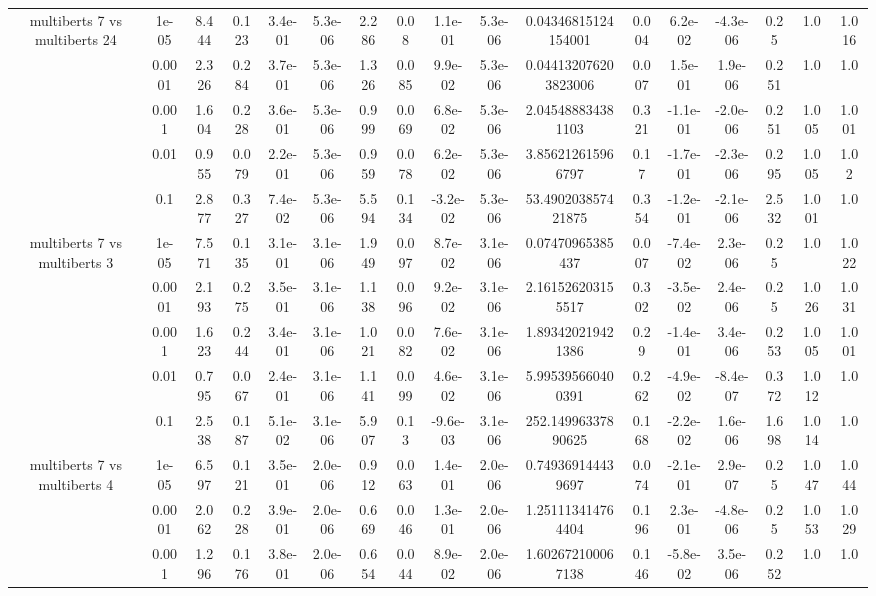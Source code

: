 \begin{tabular}{|c|c|c|c|c|c|c|c|c|c|c|c|c|c|c|c|c|}
\hline
\multirow{5}{*}{multiberts 7 vs multiberts 24} & 1e-05 & 8.444 & 0.123 & 3.4e-01 & 5.3e-06 & 2.286 & 0.08 & 1.1e-01 & 5.3e-06 & 0.04346815124154001 & 0.004 & 6.2e-02 & -4.3e-06 & 0.25 & 1.0 & 1.016 \\
 & 0.0001 & 2.326 & 0.284 & 3.7e-01 & 5.3e-06 & 1.326 & 0.085 & 9.9e-02 & 5.3e-06 & 0.044132076203823006 & 0.007 & 1.5e-01 & 1.9e-06 & 0.251 & 1.0 & 1.0 \\
 & 0.001 & 1.604 & 0.228 & 3.6e-01 & 5.3e-06 & 0.999 & 0.069 & 6.8e-02 & 5.3e-06 & 2.045488834381103 & 0.321 & -1.1e-01 & -2.0e-06 & 0.251 & 1.005 & 1.001 \\
 & 0.01 & 0.955 & 0.079 & 2.2e-01 & 5.3e-06 & 0.959 & 0.078 & 6.2e-02 & 5.3e-06 & 3.856212615966797 & 0.17 & -1.7e-01 & -2.3e-06 & 0.295 & 1.005 & 1.02 \\
 & 0.1 & 2.877 & 0.327 & 7.4e-02 & 5.3e-06 & 5.594 & 0.134 & -3.2e-02 & 5.3e-06 & 53.490203857421875 & 0.354 & -1.2e-01 & -2.1e-06 & 2.532 & 1.001 & 1.0 \\
\hline
\multirow{5}{*}{multiberts 7 vs multiberts 3} & 1e-05 & 7.571 & 0.135 & 3.1e-01 & 3.1e-06 & 1.949 & 0.097 & 8.7e-02 & 3.1e-06 & 0.07470965385437 & 0.007 & -7.4e-02 & 2.3e-06 & 0.25 & 1.0 & 1.022 \\
 & 0.0001 & 2.193 & 0.275 & 3.5e-01 & 3.1e-06 & 1.138 & 0.096 & 9.2e-02 & 3.1e-06 & 2.161526203155517 & 0.302 & -3.5e-02 & 2.4e-06 & 0.25 & 1.026 & 1.031 \\
 & 0.001 & 1.623 & 0.244 & 3.4e-01 & 3.1e-06 & 1.021 & 0.082 & 7.6e-02 & 3.1e-06 & 1.893420219421386 & 0.29 & -1.4e-01 & 3.4e-06 & 0.253 & 1.005 & 1.001 \\
 & 0.01 & 0.795 & 0.067 & 2.4e-01 & 3.1e-06 & 1.141 & 0.099 & 4.6e-02 & 3.1e-06 & 5.995395660400391 & 0.262 & -4.9e-02 & -8.4e-07 & 0.372 & 1.012 & 1.0 \\
 & 0.1 & 2.538 & 0.187 & 5.1e-02 & 3.1e-06 & 5.907 & 0.13 & -9.6e-03 & 3.1e-06 & 252.14996337890625 & 0.168 & -2.2e-02 & 1.6e-06 & 1.698 & 1.014 & 1.0 \\
\hline
\multirow{5}{*}{multiberts 7 vs multiberts 4} & 1e-05 & 6.597 & 0.121 & 3.5e-01 & 2.0e-06 & 0.912 & 0.063 & 1.4e-01 & 2.0e-06 & 0.749369144439697 & 0.074 & -2.1e-01 & 2.9e-07 & 0.25 & 1.047 & 1.044 \\
 & 0.0001 & 2.062 & 0.228 & 3.9e-01 & 2.0e-06 & 0.669 & 0.046 & 1.3e-01 & 2.0e-06 & 1.251113414764404 & 0.196 & 2.3e-01 & -4.8e-06 & 0.25 & 1.053 & 1.029 \\
 & 0.001 & 1.296 & 0.176 & 3.8e-01 & 2.0e-06 & 0.654 & 0.044 & 8.9e-02 & 2.0e-06 & 1.602672100067138 & 0.146 & -5.8e-02 & 3.5e-06 & 0.252 & 1.0 & 1.0 \\

\end{tabular}
